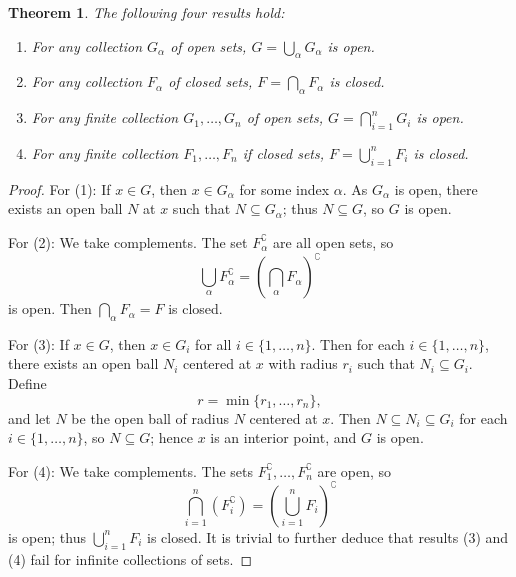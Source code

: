 \documentclass[11pt]{article}
\newtheorem{theorem}{Theorem}
\begin{document}
\newpage

\begin{theorem}
	The following four results hold:
	\begin{enumerate}
		\item For any collection $G_{\alpha}$ of open sets, $G = \bigcup_{\alpha} G_{\alpha}$ is open.
		\item For any collection $F_{\alpha}$ of closed sets, $F = \bigcap_{\alpha} F_{\alpha}$ is closed.
		\item For any finite collection $G_{1}, \ldots, G_{n}$ of open sets, $G = \bigcap_{i = 1}^{n} G_{i}$ is open.
		\item For any finite collection $F_{1}, \ldots, F_{n}$ if closed sets, $F = \bigcup_{i = 1}^{n} F_{i}$ is closed.
	\end{enumerate}
\end{theorem}
\begin{adjustwidth}{1cm}{}
	\begin{proof}
		For (1): If $x \in G$, then $x \in G_{\alpha}$ for some index $\alpha$. As $G_{\alpha}$ is open, there exists an open ball $N$ at $x$ such that $N \subseteq G_{\alpha}$; thus $N \subseteq G$, so $G$ is open.

		For (2): We take complements. The set $F_{\alpha}^{\complement}$ are all open sets, so
		\[
			\bigcup\limits_{\alpha} F_{\alpha}^{\complement} = \left( \bigcap\limits_{\alpha} F_{\alpha} \right)^{\complement}
		\]
		is open. Then $\bigcap_{\alpha} F_{\alpha} = F$ is closed.

		For (3): If $x \in G$, then $x \in G_{i}$ for all $i \in \{ 1, \ldots, n \}$. Then for each $i \in \{ 1, \ldots, n \}$, there exists an open ball $N_{i}$ centered at $x$ with radius $r_{i}$ such that $N_{i} \subseteq G_{i}$. Define
		\[
			r = \min \{ r_{1}, \ldots, r_{n} \},
		\]
		and let $N$ be the open ball of radius $N$ centered at $x$. Then $N \subseteq N_{i} \subseteq G_{i}$ for each $i \in \{ 1, \ldots, n \}$, so $N \subseteq G$; hence $x$ is an interior point, and $G$ is open.

		For (4): We take complements. The sets $F_{1}^{\complement}, \ldots, F_{n}^{\complement}$ are open, so
		\[
			\bigcap\limits_{i = 1}^{n} (F_{i}^{\complement}) = \left( \bigcup\limits_{i = 1}^{n} F_{i} \right)^{\complement}
		\]
		is open; thus $\bigcup_{i = 1}^{n} F_{i}$ is closed. It is trivial to further deduce that results (3) and (4) fail for infinite collections of sets.
	\end{proof}
\end{adjustwidth}
\end{document}
